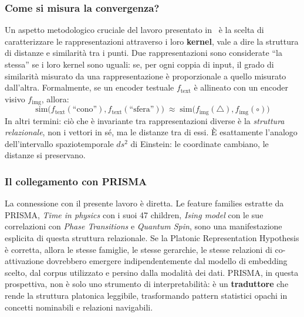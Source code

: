 \subsubsection{Come si misura la convergenza?}
\label{subsubsec:misura_convergenza}
Un aspetto metodologico cruciale del lavoro presentato in~\parencite{huh2024platonic} è la scelta di caratterizzare le rappresentazioni attraverso i loro \textbf{kernel}, vale a dire la struttura di distanze e similarità tra i punti. Due rappresentazioni sono considerate ``la stessa'' se i loro kernel sono uguali: se, per ogni coppia di input, il grado di similarità misurato da una rappresentazione è proporzionale a quello misurato dall'altra.
Formalmente, se un encoder testuale $f_{\text{text}}$ è allineato con un encoder visivo $f_{\text{img}}$, allora:
\begin{equation}
    \text{sim}\big(
        f_{\text{text}}(\text{``cono''}),
        f_{\text{text}}(\text{``sfera''})
    \big)
    \;\approx\;
    \text{sim}\big(
        f_{\text{img}}(\triangle),
        f_{\text{img}}(\circ)
    \big)
    \label{eq:kernel_alignment}
\end{equation}
In altri termini: ciò che è invariante tra rappresentazioni diverse è la \textit{struttura relazionale}, non i vettori in sé, ma le distanze tra di essi. È esattamente l'analogo dell'intervallo spaziotemporale $ds^2$ di Einstein: le coordinate cambiano, le distanze si preservano.
\subsubsection{Il collegamento con PRISMA}
\label{subsubsec:collegamento_prisma}
La connessione con il presente lavoro è diretta. Le feature families estratte da PRISMA, \textit{Time in physics} con i suoi 47 children, \textit{Ising model} con le sue correlazioni con \textit{Phase Transitions} e \textit{Quantum Spin}, sono una manifestazione esplicita di questa struttura relazionale.
Se la Platonic Representation Hypothesis è corretta, allora le stesse famiglie, le stesse gerarchie, le stesse relazioni di co-attivazione dovrebbero emergere indipendentemente dal modello di embedding scelto, dal corpus utilizzato e persino dalla modalità dei dati.
PRISMA, in questa prospettiva, non è solo uno strumento di interpretabilità: è un \textbf{traduttore} che rende la struttura platonica leggibile, trasformando pattern statistici opachi in concetti nominabili e relazioni navigabili.
